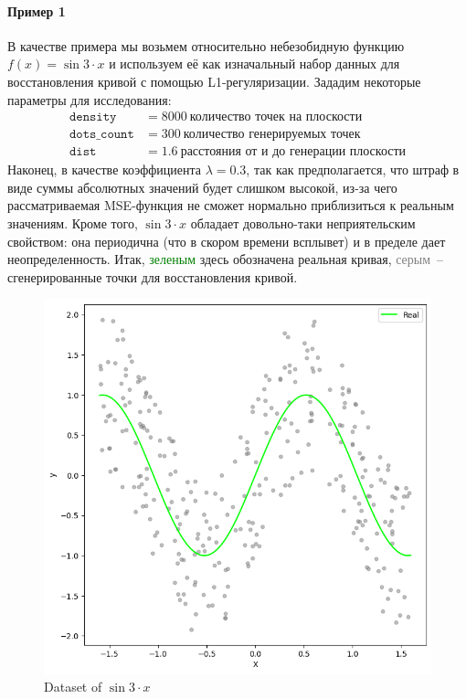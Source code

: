 \documentclass[12pt, a4paper, oneside, final]{article}
\begin{document}
	\paragraph{Пример 1}
	В качестве примера мы возьмем относительно небезобидную функцию $f(x) = \sin{3 \cdot x}$ и используем её как изначальный набор данных для восстановления кривой с помощью L1-регуляризации.
	Зададим некоторые параметры для исследования:
	\begin{align*}
		\mathtt{density} &= 8000~\text{количество точек на плоскости} \\
		\mathtt{dots\_count} &= 300~\text{количество генерируемых точек} \\
		\mathtt{dist} &= 1.6~\text{расстояния от и до генерации плоскости}
	\end{align*}
	Наконец, в качестве коэффициента $\lambda = 0.3$, так как предполагается, что штраф в виде суммы абсолютных значений будет слишком высокой, из-за чего рассматриваемая MSE-функция не сможет нормально приблизиться к реальным значениям.
	Кроме того, $\sin{3 \cdot x}$ обладает довольно-таки неприятельским свойством: она периодична (что в скором времени всплывет) и в пределе дает неопределенность.
	Итак, \textcolor{green}{зеленым} здесь обозначена реальная кривая, \textcolor{gray}{серым}~-- сгенерированные точки для восстановления кривой.
	\begin{figure}[H]
		\centering
		\includegraphics[scale = 0.8]{Image/AT2_L1_DATA.png}
		\caption*{Dataset of $\sin{3 \cdot x}$}
	\end{figure}
\end{document}
